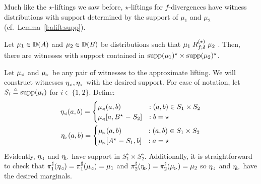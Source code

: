 \documentclass{lmcs}
\begin{document}
Much like the $\star$-liftings we saw before, $\star$-liftings for
$f$-divergences have witness distributions with support determined by the
support of $\mu_1$ and $\mu_2$ (cf.\ Lemma~\ref{l:alift:supp}).

\begin{lem} \label{l:flift:supp}
  Let $\mu_1 \in \Dist(A)$ and $\mu_2 \in \Dist(B)$ be distributions such that
  $ \mu_1 \aliftnew{R}{f; \delta} \mu_2 $ .
  Then, there are witnesses with support contained in $\supp(\mu_1)^\star \times
  \supp(\mu_2)^\star$.
\end{lem}

\proofatend
  Let $\mu\lside$ and $\mu\rside$ be any pair of witnesses to the approximate
  lifting.  We will construct witnesses $\eta\lside, \eta\rside$ with the
  desired support. For ease of notation, let $S_i \eqdef \supp(\mu_i)$ for
  $i \in \{ 1, 2 \}$.  Define:
  \[
    \begin{gathered}
    \eta\lside(a, b) =
    \begin{cases}
      \mu\lside(a, b) &: (a, b) \in S_1 \times S_2 \\
      \mu\lside[a, B^\star \setminus S_2] &: b = \star
    \end{cases} \\
    \eta\rside(a, b) =
    \begin{cases}
      \mu\rside(a, b) &: (a, b) \in S_1 \times S_2 \\
      \mu\rside[A^\star \setminus S_1, b] &: a = \star
    \end{cases}
    \end{gathered}
  \]
  Evidently, $\eta\lside$ and $\eta\rside$ have support in $S_1^\star \times
  S_2^\star$. Additionally, it is straightforward to check that
  $\dfst(\eta\lside) = \dfst(\mu\lside) = \mu_1$ and $\dsnd(\eta\rside) =
  \dsnd(\mu\rside) = \mu_2$ so $\eta\lside$ and $\eta\rside$ have the desired
  marginals.
\end{document}
